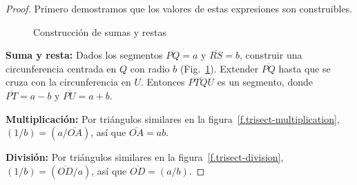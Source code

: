 \begin{proof} Primero demostramos que los valores de estas expresiones son construibles.

\begin{figure}[b]
\begin{center}
\end{center}
\caption{Construcción de sumas y restas}\label{f.trisect-add-subtract}
\end{figure}

\noindent\textbf{Suma y resta:}
Dados los segmentos $\overline{PQ}=a$ y $\overline{RS}=b$, construir una circunferencia centrada en $Q$ con radio $b$ (Fig.~\ref{f.trisect-add-subtract}). Extender $\overline{PQ}$ hasta que se cruza con la circunferencia en $U$. Entonces $\overline{PTQU}$ es un segmento, donde $\overline{PT}=a-b$ y $\overline{PU}=a+b$.

\noindent\textbf{Multiplicación:}
Por triángulos similares en la figura~\ref{f.trisect-multiplication},
$(1/b)=(a/\overline{OA})$, así que $\overline{OA}=ab$.

\noindent\textbf{División:}
Por triángulos similares en la figura~\ref{f.trisect-division},
$(1/b)=(\overline{OD}/a)$, así que $\overline{OD}=(a/b)$.


\end{proof}
